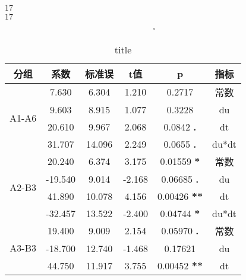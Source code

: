 \documentclass{article}
\begin{document}





17\\
$17$

























$$ ^{\circ}  $$
\newpage
\begin{table}
    \centering
    \caption{title}
    \begin{tabular}{c|c|c|c|c|c}
        \hline
        分组                    & 系数    & 标准误 & t值    & p                 &  指标     \\
        \hline
        \multirow{4}{*}{A1-A6}  & 7.630   & 6.304  & 1.210  & 0.2717            & 常数  \\
                                & 9.603   & 8.915  & 1.077  & 0.3228            & du    \\
                                & 20.610  & 9.967  & 2.068  & 0.0842 \textbf{.} & dt    \\
                                & 31.707  & 14.096 & 2.249  & 0.0655 \textbf{.} & du*dt \\
        \hline
        \multirow{4}{*}{A2-B3} & 20.240  & 6.374  & 3.175  & 0.01559 \textbf{*}         & 常数  \\
                                & -19.540 & 9.014  & -2.168 & 0.06685 \textbf{.}         & du    \\
                                & 41.890  & 10.078 & 4.156  & 0.00426 \textbf{**}        & dt    \\
                                & -32.457 & 13.522 & -2.400 & 0.04744 \textbf{*}         & du*dt \\
        \hline
        \multirow{4}{*}{A3-B3} & 19.400  & 9.009  & 2.154  & 0.05970 \textbf{.}         & 常数  \\
                                & -18.700 & 12.740 & -1.468 & 0.17621           & du    \\
                                & 44.750  & 11.917 & 3.755  & 0.00452 \textbf{**}        & dt    \\

\end{tabular}
\end{table}
\end{document}

